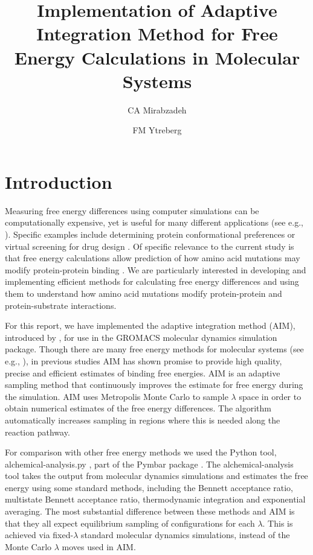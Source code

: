 \documentclass[fleqn,10pt,lineno]{wlpeerj} %
\title{Implementation of Adaptive Integration Method for Free Energy Calculations in Molecular Systems}
\author[1]{CA Mirabzadeh}
\author[2]{FM Ytreberg}
\affil[1,2]{Department of Physics, University of Idaho, Moscow ID}
\begin{document}
\flushbottom
\maketitle
\thispagestyle{empty}

\section*{Introduction} \label{introduction}

Measuring free energy differences using computer simulations can be computationally expensive, yet is useful for many different applications (see e.g., \cite{SteinBrecher2010,Chodera2011a,Mobley2013,Zhan2013,Miller2014,Petukh2015,Zhan2015,Wichman2016,Cournia2017}). Specific examples include determining protein conformational preferences or virtual screening for drug design \citep{Zhan2015, SteinBrecher2010, Chodera2011a}. Of specific relevance to the current study is that free energy calculations allow prediction of how amino acid mutations may modify protein-protein binding \citep{Zhan2013, Miller2014, Petukh2015, Wichman2016}. We are particularly interested in developing and implementing efficient methods for calculating free energy differences and using them to understand how amino acid mutations modify protein-protein and protein-substrate interactions. 

For this report, we have implemented the adaptive integration method (AIM), introduced by \cite{Fasnacht2004}, for use in the GROMACS \citep{Berendsen1995} molecular dynamics simulation package. Though there are many free energy methods for molecular systems (see e.g., \cite{Lyubartsev1996,Goncalves2004, Kofke2005, Shirts2007, Chodera2011, Klimovich2015}), in previous studies AIM has shown promise to provide high quality, precise and efficient estimates of binding free energies\citep{Ytreberg2006, Kaus2014}. AIM is an adaptive sampling method that continuously improves the estimate for free energy during the simulation. AIM uses Metropolis Monte Carlo to sample $\lambda$ space in order to obtain numerical estimates of the free energy differences. The algorithm automatically increases sampling in regions where this is needed along the reaction pathway.

For comparison with other free energy methods we used the Python tool, alchemical-analysis.py \citep{Klimovich2015}, part of the Pymbar package \citep{Shirts2008}. The alchemical-analysis tool takes the output from molecular dynamics simulations and estimates the free energy using some standard methods, including the Bennett acceptance ratio, multistate Bennett acceptance ratio, thermodynamic integration and exponential averaging. 
The most substantial difference between these methods and AIM is that they all expect equilibrium sampling of configurations for each $\lambda$. This is achieved via fixed-$\lambda$ standard molecular dynamics simulations, instead of the Monte Carlo $\lambda$ moves used in AIM.
\end{document}
